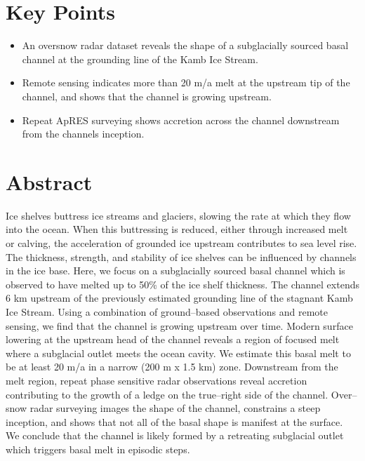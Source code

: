 \label{ch:data}


\section{Key Points}
\begin{itemize}
\item An oversnow radar dataset reveals the shape of a subglacially sourced basal channel at the grounding line of the Kamb Ice Stream.
\item Remote sensing indicates more than 20 m/a melt at the upstream tip of the channel, and shows that the channel is growing upstream.
\item Repeat ApRES surveying shows accretion across the channel downstream from the channels inception.
\end{itemize}


\section{Abstract}
Ice shelves buttress ice streams and glaciers, slowing the rate at which they flow into the ocean. When this buttressing is reduced, either through increased melt or calving, the acceleration of grounded ice upstream contributes to sea level rise. The thickness, strength, and stability of ice shelves can be influenced by channels in the ice base.
Here, we focus on a subglacially sourced basal channel which is observed to have melted up to 50\% of the ice shelf thickness. The channel extends 6 km upstream of the previously estimated grounding line of the stagnant Kamb Ice Stream. Using a combination of ground--based observations and remote sensing, we find that the channel is growing upstream over time. Modern surface lowering at the upstream head of the channel reveals a region of focused melt where a subglacial outlet meets the ocean cavity. We estimate this basal melt to be at least 20 m/a in a narrow (200 m x 1.5 km) zone. Downstream from the melt region, repeat phase sensitive radar observations reveal accretion contributing to the growth of a ledge on the true--right side of the channel.  Over--snow radar surveying images the shape of the channel, constrains a steep inception, and shows that not all of the basal shape is manifest at the surface. 
We conclude that the channel is likely formed by a retreating subglacial outlet which triggers basal melt in episodic steps.


